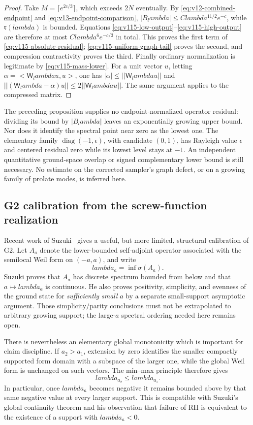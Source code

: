 \documentclass[11pt]{article}
\def\lambda{lambda}%
\def\norm#1{||#1||}%
\def\ip#1#2{<#1,#2>}%
\theoremstyle{remark}
\newcommand{\norm}[1]{\left\lVert #1\right\rVert}
\newcommand{\ip}[2]{\left\langle #1,#2\right\rangle}
\begin{document}
\begin{proof}
Take $M=\lceil e^{2c/3}\rceil$, which exceeds $2N$ eventually.
By \eqref{eq:v12-combined-endpoint} and
\eqref{eq:v13-endpoint-comparison},
$|B_\lambda|\le C\lambda^{11/2}e^{-c}$, while
$\mathfrak r(\lambda)$ is bounded. Equations
\eqref{eq:v115-low-output}--\eqref{eq:v115-high-output} are therefore
at most $C\lambda^6e^{-c/3}$ in total. This proves the first term of
\eqref{eq:v115-absolute-residual};
\eqref{eq:v115-uniform-graph-tail} proves the second, and compression
contractivity proves the third.
Finally ordinary normalization is legitimate by
\eqref{eq:v115-mass-lower}. For a unit vector $u$, letting
$\alpha=\ip{\mathsf W_\lambda u}u$, one has
$|\alpha|\le\norm{\mathsf W_\lambda u}$ and
$\norm{(\mathsf W_\lambda-\alpha)u}\le2\norm{\mathsf W_\lambda u}$.
The same argument applies to the compressed matrix.
\end{proof}

The preceding proposition supplies no endpoint-normalized operator residual:
dividing its bound by $|B_\lambda|$ leaves an exponentially growing
upper bound. Nor does it identify the spectral point near zero as the
lowest one. The elementary family $\operatorname{diag}(-1,\epsilon)$,
with candidate $(0,1)$, has Rayleigh value $\epsilon$ and centered
residual zero while its lowest level stays at $-1$. An independent
quantitative ground-space overlap or signed complementary lower bound
is still necessary. No estimate on the corrected sampler's graph defect,
or on a growing family of prolate modes, is inferred here.

\subsection{G2 calibration from the screw-function realization}
Recent work of Suzuki~\cite{Suzuki2026} gives a useful, but more limited, structural calibration of G2.  Let $A_a$ denote the lower-bounded self-adjoint operator associated with the semilocal Weil form on $(-a,a)$, and write
\[
 \lambda_a=\inf\sigma(A_a).
\]
Suzuki proves that $A_a$ has discrete spectrum bounded from below and that $a\mapsto\lambda_a$ is continuous.  He also proves positivity, simplicity, and evenness of the ground state for \emph{sufficiently small} $a$ by a separate small-support asymptotic argument.  Those simplicity/parity conclusions must not be extrapolated to arbitrary growing support; the large-$a$ spectral ordering needed here remains open.

There is nevertheless an elementary global monotonicity which is important for claim discipline.  If $a_2>a_1$, extension by zero identifies the smaller compactly supported form domain with a subspace of the larger one, while the global Weil form is unchanged on such vectors.  The min--max principle therefore gives
\begin{equation*}
 \boxed{\lambda_{a_2}\le \lambda_{a_1}.}
 \tag{G2.1}\label{eq:g2-monotone}
\end{equation*}
In particular, once $\lambda_a$ becomes negative it remains bounded above by that same negative value at every larger support.  This is compatible with Suzuki's global continuity theorem and his observation that failure of RH is equivalent to the existence of a support with $\lambda_a<0$.
\end{document}
